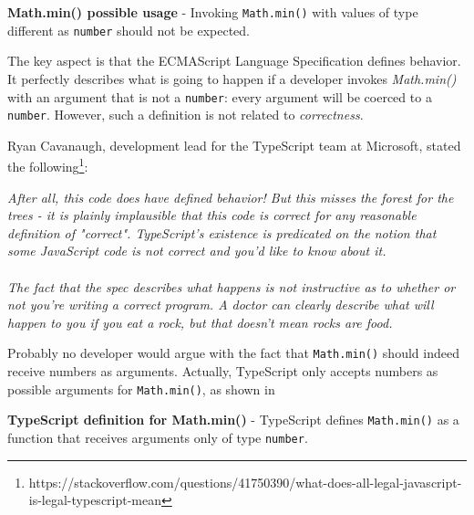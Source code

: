 \begin{code}
  \captionsetup{aboveskip=0pt, belowskip=10pt}
  \caption[Math.min() possible usage]{\textbf{Math.min() possible usage} - Invoking \texttt{Math.min()} with values of type different as \texttt{number} should not be expected.}
  \label{code:type-inference-multiply-probably-incorrect}
\end{code}

The key aspect is that the ECMAScript Language Specification defines behavior. It perfectly describes what is going to happen if a developer invokes \textit{Math.min()} with an argument that is not a \texttt{number}: every argument will be coerced to a \texttt{number}. However, such a definition is not related to \textit{correctness}.

Ryan Cavanaugh, development lead for the TypeScript team at Microsoft, stated the following\footnote{https://stackoverflow.com/questions/41750390/what-does-all-legal-javascript-is-legal-typescript-mean}:

\begin{displayquote}
  \textit{After all, this code does have defined behavior! But this misses the forest for the trees - it is plainly implausible that this code is correct for any reasonable definition of "correct". TypeScript's existence is predicated on the notion that some JavaScript code is not correct and you'd like to know about it.}
  \\
  \\
  \textit{The fact that the spec describes what happens is not instructive as to whether or not you're writing a correct program. A doctor can clearly describe what will happen to you if you eat a rock, but that doesn't mean rocks are food.}
\end{displayquote}

Probably no developer would argue with the fact that \texttt{Math.min()} should indeed receive numbers as arguments. Actually, TypeScript only accepts numbers as possible arguments for \texttt{Math.min()}, as shown in 

\begin{code}
  \captionsetup{aboveskip=0pt, belowskip=10pt}
  \caption[TypeScript definition for Math.min()]{\textbf{TypeScript definition for Math.min()} - TypeScript defines \texttt{Math.min()} as a function that receives arguments only of type \texttt{number}.}
  \label{code:type-inference-multiply-probably-incorrect}
\end{code}

